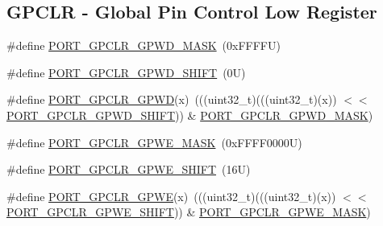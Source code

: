 \subsection*{G\+P\+C\+LR -\/ Global Pin Control Low Register}
\begin{DoxyCompactItemize}
\item 
\#define \mbox{\hyperlink{group___p_o_r_t___register___masks_gaa7e4a890e9d09d85279889ce3ecb0044}{P\+O\+R\+T\+\_\+\+G\+P\+C\+L\+R\+\_\+\+G\+P\+W\+D\+\_\+\+M\+A\+SK}}~(0x\+F\+F\+F\+F\+U)
\item 
\#define \mbox{\hyperlink{group___p_o_r_t___register___masks_gaafacaac0aa215f596b947609857d6491}{P\+O\+R\+T\+\_\+\+G\+P\+C\+L\+R\+\_\+\+G\+P\+W\+D\+\_\+\+S\+H\+I\+FT}}~(0\+U)
\item 
\#define \mbox{\hyperlink{group___p_o_r_t___register___masks_gae13a63b19950557e19c9a884f3d3b77a}{P\+O\+R\+T\+\_\+\+G\+P\+C\+L\+R\+\_\+\+G\+P\+WD}}(x)~(((uint32\+\_\+t)(((uint32\+\_\+t)(x)) $<$$<$ \mbox{\hyperlink{group___p_o_r_t___register___masks_gaafacaac0aa215f596b947609857d6491}{P\+O\+R\+T\+\_\+\+G\+P\+C\+L\+R\+\_\+\+G\+P\+W\+D\+\_\+\+S\+H\+I\+FT}})) \& \mbox{\hyperlink{group___p_o_r_t___register___masks_gaa7e4a890e9d09d85279889ce3ecb0044}{P\+O\+R\+T\+\_\+\+G\+P\+C\+L\+R\+\_\+\+G\+P\+W\+D\+\_\+\+M\+A\+SK}})
\item 
\#define \mbox{\hyperlink{group___p_o_r_t___register___masks_ga49c4160370859546837be80a2eed1365}{P\+O\+R\+T\+\_\+\+G\+P\+C\+L\+R\+\_\+\+G\+P\+W\+E\+\_\+\+M\+A\+SK}}~(0x\+F\+F\+F\+F0000\+U)
\item 
\#define \mbox{\hyperlink{group___p_o_r_t___register___masks_ga340d6aadd9516b3cac26187b014ce9d3}{P\+O\+R\+T\+\_\+\+G\+P\+C\+L\+R\+\_\+\+G\+P\+W\+E\+\_\+\+S\+H\+I\+FT}}~(16\+U)
\item 
\#define \mbox{\hyperlink{group___p_o_r_t___register___masks_ga52502515ea180d574d919f0ec155da74}{P\+O\+R\+T\+\_\+\+G\+P\+C\+L\+R\+\_\+\+G\+P\+WE}}(x)~(((uint32\+\_\+t)(((uint32\+\_\+t)(x)) $<$$<$ \mbox{\hyperlink{group___p_o_r_t___register___masks_ga340d6aadd9516b3cac26187b014ce9d3}{P\+O\+R\+T\+\_\+\+G\+P\+C\+L\+R\+\_\+\+G\+P\+W\+E\+\_\+\+S\+H\+I\+FT}})) \& \mbox{\hyperlink{group___p_o_r_t___register___masks_ga49c4160370859546837be80a2eed1365}{P\+O\+R\+T\+\_\+\+G\+P\+C\+L\+R\+\_\+\+G\+P\+W\+E\+\_\+\+M\+A\+SK}})
\end{DoxyCompactItemize}

